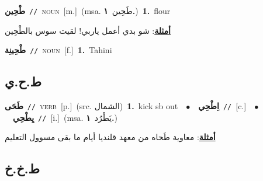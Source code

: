 \documentclass[10pt,a4paper,twoside]{article} %
\begin{document}
\begin{multicols}{2}
{\setlength\topsep{0pt}\textbf{\foreignlanguage{arabic}{طْحِين}}\ {\color{gray}\texttt{//}\color{black}}\ \textsc{noun}\ [m.]\ \color{gray}(msa. \foreignlanguage{arabic}{طَحِين}~\foreignlanguage{arabic}{\textbf{١.}})\color{black}\ \textbf{1.}~flour\  \begin{flushright}\color{gray}\foreignlanguage{arabic}{\textbf{\underline{\foreignlanguage{arabic}{أمثلة}}}: شو بدي أعمل ياربي! لقيت سوس بالطْحِين}\end{flushright}\color{black}} \vspace{2mm}

{\setlength\topsep{0pt}\textbf{\foreignlanguage{arabic}{طْحِينِة}}\ {\color{gray}\texttt{//}\color{black}}\ \textsc{noun}\ [f.]\ \textbf{1.}~Tahini\ } \vspace{2mm}

\vspace{-3mm}
\subsection*{\color{blue}\foreignlanguage{arabic}{ط.ح.ي}\color{blue}{}} 

{\setlength\topsep{0pt}\textbf{\foreignlanguage{arabic}{طَحَى}}\ {\color{gray}\texttt{//}\color{black}}\ \textsc{verb}\ [p.]\ (src. \color{gray}\foreignlanguage{arabic}{الشمال}\color{black})\ \textbf{1.}~kick sb out\ \ $\bullet$\ \ \setlength\topsep{0pt}\textbf{\foreignlanguage{arabic}{اِطْحِي}}\ {\color{gray}\texttt{//}\color{black}}\ [c.]\ \ $\bullet$\ \ \setlength\topsep{0pt}\textbf{\foreignlanguage{arabic}{يِطْحِي}}\ {\color{gray}\texttt{//}\color{black}}\ [i.]\ \color{gray}(msa. \foreignlanguage{arabic}{يَطْرُد}~\foreignlanguage{arabic}{\textbf{١.}})\color{black}\  \begin{flushright}\color{gray}\foreignlanguage{arabic}{\textbf{\underline{\foreignlanguage{arabic}{أمثلة}}}: معاوية طَحاه من معهد قلنديا أيام ما بقى مسوول التعليم}\end{flushright}\color{black}} \vspace{2mm}

\vspace{-3mm}
\subsection*{\color{blue}\foreignlanguage{arabic}{ط.خ.خ}\color{blue}{}} 


\end{multicols}
\end{document}
